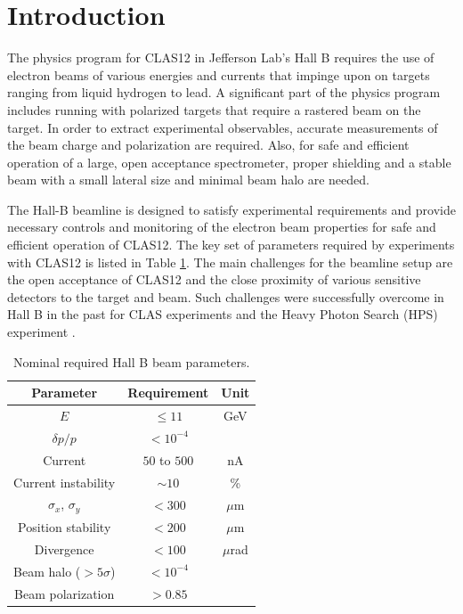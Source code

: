 \section{Introduction}
\label{introduction}

The physics program for CLAS12 in Jefferson Lab's Hall B requires the use of electron beams of various energies and currents that impinge
upon on targets ranging from liquid hydrogen to lead. A significant part of the physics program includes running with polarized targets that 
require a rastered beam on the target. In order to extract experimental observables, accurate measurements of the beam charge and 
polarization are required. Also, for safe and efficient operation of a large, open acceptance spectrometer, proper shielding and a stable beam 
with a small lateral size and minimal beam halo are needed. 

The Hall-B beamline is designed to satisfy experimental requirements and provide necessary controls and monitoring 
of the electron beam properties for safe and efficient operation of CLAS12. The key set of parameters required by experiments with CLAS12 
is listed in Table \ref{tab:beam_par}. The main challenges for the beamline setup are the open acceptance of CLAS12 and the close proximity 
of various sensitive detectors to the target and beam. Such challenges were successfully overcome in Hall B in the past for CLAS \cite{CLAS} 
experiments and the Heavy Photon Search (HPS) experiment \cite{HPS}.

 \begin{table}[htb]
 \centering
 \begin{tabular}{|c|c|c|}
\hline
Parameter & Requirement &Unit \\ \hline 
$E$ &  $\le 11$& GeV \\ \hline
$\delta p/p$ & $< 10^{-4}$ & \\ \hline 
Current & $50$ to $500$ & nA \\ \hline
Current instability & $\sim 10$ &\% \\ \hline 
$\sigma_x $, $\sigma_y$&$< 300$& $\mu$m \\ \hline 
Position stability &$< 200$ &$\mu$m \\ \hline
Divergence& $< 100$& $\mu$rad \\ \hline 
Beam halo ($> 5\sigma$) &$< 10^{-4}$& \\ \hline
Beam polarization &$> 0.85$& \\ \hline
\end{tabular}
\caption{Nominal required Hall B beam parameters.} 
\label{tab:beam_par}
\end{table}

